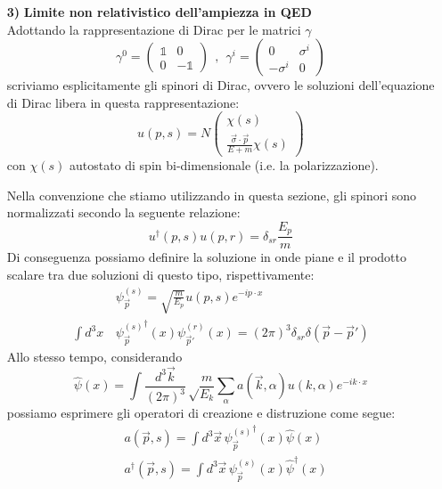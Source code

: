\documentclass[../main.tex]{subfiles}
\begin{document}
\begin{enumerate}
    \item[\textbf{3)}] \textbf{Limite non relativistico dell'ampiezza in QED}\\
    Adottando la rappresentazione di Dirac per le matrici $\gamma$
    \[
    \gamma^0 = 
    \begin{pmatrix} 
    \mathbb 1 &          0\\
            0 & -\mathbb 1
    \end{pmatrix} ~~,~~
    \gamma^i = 
    \begin{pmatrix} 
            0 &   \sigma^i\\
    -\sigma^i &          0
    \end{pmatrix}
    \]
    scriviamo esplicitamente gli spinori di Dirac, ovvero le soluzioni dell'equazione di Dirac libera in questa rappresentazione:
    \[
    u(p,s) = N
    \begin{pmatrix} 
        \chi(s) \\
        \frac{\Vec\sigma\cdot \Vec p}{E+m}\chi(s)
    \end{pmatrix}
    \]
    con $\chi(s)$ autostato di spin bi-dimensionale (i.e. la polarizzazione).
    \begin{nota}
        Nella convenzione che stiamo utilizzando in questa sezione, gli spinori sono normalizzati secondo la seguente relazione:
        \begin{equation}
            u^\dagger(p,s)u(p,r) = \delta_{sr}\frac{E_p}{m}
            \label{eq:spinor_normalization}
        \end{equation}
        Di conseguenza possiamo definire la soluzione in onde piane e il prodotto scalare tra due soluzioni di questo tipo, rispettivamente:
        \begin{align*}
            &\psi_{\Vec{p}}^{(s)} = \sqrt{\frac{m}{E_p}} u(p,s)e^{-ip\cdot x}\\ 
            \int d^3x \, &{\psi_{\Vec{p}}^{(s)}}^\dagger(x) \psi_{\Vec{p}'}^{(r)}(x) = (2\pi)^3\delta_{sr}\delta(\Vec{p}-\Vec p')
        \end{align*}
        Allo stesso tempo, considerando 
        \[ \hat\psi(x) = \int\frac{d^3\Vec{k}}{(2\pi)^3}\sqrt\frac{m}{E_k}\sum_\alpha a(\Vec k,\alpha)u(k,\alpha)e^{-ik\cdot x} 
        \]
        possiamo esprimere gli operatori di creazione e distruzione come segue:
        \begin{align*}
            &a(\Vec{p},s) = \int d^3\Vec{x} \, {\psi_{\Vec{p}}^{(s)}}^\dagger(x)\hat\psi(x)\\
            &a^\dagger(\Vec{p},s) = \int d^3\Vec{x} \, {\psi_{\Vec{p}}^{(s)}}(x)\hat\psi^\dagger(x)
        \end{align*}


\end{nota}
\end{enumerate}
\end{document}
